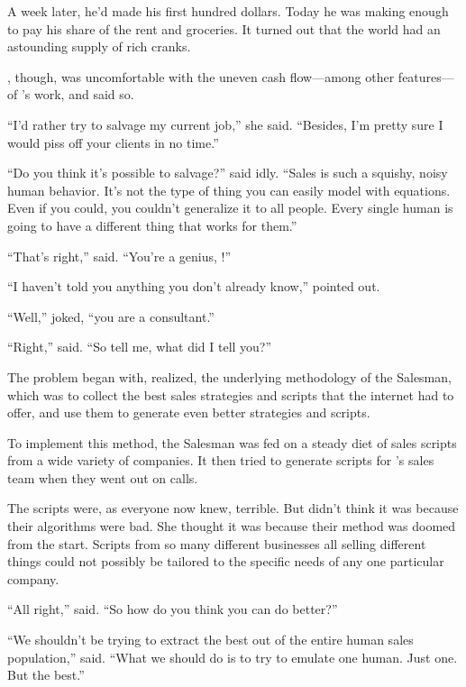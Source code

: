 A week later, he'd made his first hundred dollars. Today he was making enough to pay his share of the rent and groceries. It turned out that the world had an astounding supply of rich cranks.

{\protag}, though, was uncomfortable with the uneven cash flow---among other features---of {\sidetag}'s work, and said so.

``I'd rather try to salvage my current job,'' she said. ``Besides, I'm pretty sure I would piss off your clients in no time.''

``Do you think it's possible to salvage?'' {\sidetag} said idly. ``Sales is such a squishy, noisy human behavior. It's not the type of thing you can easily model with equations. Even if you could, you couldn't generalize it to all people. Every single human is going to have a different thing that works for them.''

``That's right,'' {\protag} said. ``You're a genius, {\sidetag}!''

``I haven't told you anything you don't already know,'' {\sidetag} pointed out.

``Well,'' {\protag} joked, ``you are a consultant.''

``Right,'' {\sidetag} said. ``So tell me, what did I tell you?''

\bigbreak

The problem began with, {\protag} realized, the underlying methodology of the Salesman, which was to collect the best sales strategies and scripts that the internet had to offer, and use them to generate even better strategies and scripts.

To implement this method, the Salesman was fed on a steady diet of sales scripts from a wide variety of companies. It then tried to generate scripts for \energyCompany{}'s sales team when they went out on calls.

The scripts were, as everyone now knew, terrible. But {\protag} didn't think it was because their algorithms were bad. She thought it was because their method was doomed from the start. Scripts from so many different businesses all selling different things could not possibly be tailored to the specific needs of any one particular company.

``All right,'' {\sidetag} said. ``So how do you think you can do better?''

``We shouldn't be trying to extract the best out of the entire human sales population,'' {\protag} said. ``What we should do is to try to emulate one human. Just one. But the best.''

